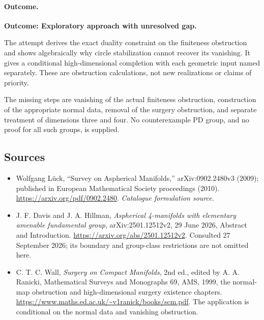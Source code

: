 \documentclass[11pt,a4paper]{article}
\numberwithin{equation}{section}
\begin{document}
\paragraph{Outcome.}
\textbf{Outcome: Exploratory approach with unresolved gap.}

The attempt derives the exact duality constraint on the finiteness
obstruction and shows algebraically why circle stabilization cannot
recover its vanishing. It gives a conditional high-dimensional
completion with each geometric input named separately. These are
obstruction calculations, not new realizations or claims of priority.

The missing steps are vanishing of the actual finiteness obstruction,
construction of the appropriate normal data, removal of the surgery
obstruction, and separate treatment of dimensions three and four.
No counterexample PD group, and no proof for all such groups, is supplied.
\subsection{Sources}
\begin{itemize}\raggedright
\item[\textnormal{[S1]}]\hypertarget{source:30006797:1}{} Wolfgang Lück, “Survey on Aspherical Manifolds,” arXiv:0902.2480v3 (2009); published in European Mathematical Society proceedings (2010).
\url{https://arxiv.org/pdf/0902.2480}.
{\small\textit{Catalogue formulation source.}}
\item[\textnormal{[E1]}]\hypertarget{extra:30006797:1}{}
J. F. Davis and J. A. Hillman, \emph{Aspherical 4-manifolds with elementary
amenable fundamental group}, arXiv:2501.12512v2, 29 June 2026, Abstract
and Introduction. \url{https://arxiv.org/abs/2501.12512v2}.
Consulted 27 September 2026; its boundary and group-class restrictions
are not omitted here.
\item[\textnormal{[E2]}]\hypertarget{extra:30006797:2}{}
C. T. C. Wall, \emph{Surgery on Compact Manifolds}, 2nd ed., edited by
A. A. Ranicki, Mathematical Surveys and Monographs 69, AMS, 1999,
the normal-map obstruction and high-dimensional surgery existence
chapters. \url{https://www.maths.ed.ac.uk/~v1ranick/books/scm.pdf}.
The application is conditional on the normal data and vanishing obstruction.
\end{itemize}
\end{document}
